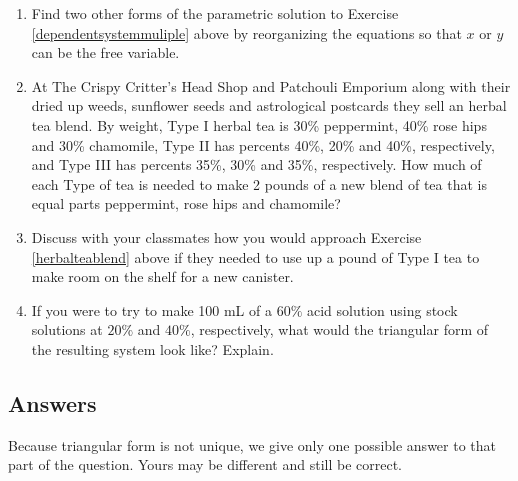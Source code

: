 \begin{enumerate}
\setcounter{enumi}{\value{HW}}

\item Find two other forms of the parametric solution to Exercise \ref{dependentsystemmuliple} above by reorganizing the equations so that $x$ or $y$ can be the free variable.

\item \label{herbalteablend} At The Crispy Critter's Head Shop and Patchouli Emporium along with their dried up weeds, sunflower seeds and astrological postcards they sell an herbal tea blend.  By weight, Type I herbal tea is 30\% peppermint, 40\% rose hips and 30\% chamomile, Type II has percents 40\%, 20\% and 40\%, respectively, and Type III has percents 35\%, 30\% and 35\%, respectively.  How much of each Type of tea is needed to make 2 pounds of a new blend of tea that is equal parts peppermint, rose hips and chamomile?  

\item Discuss with your classmates how you would approach Exercise \ref{herbalteablend} above if they needed to use up a pound of Type I tea to make room on the shelf for a new canister.

\item If you were to try to make 100 mL of a $60\%$ acid solution using stock solutions at $20\%$ and $40\%$, respectively, what would the triangular form of the resulting system look like?  Explain.

\end{enumerate}

\newpage

\subsection{Answers}


Because triangular form is not unique, we give only one possible answer to that part of the question.  Yours may be different and still be correct.

